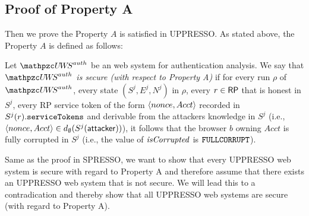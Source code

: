   \subsection{Proof of Property A}
  Then we prove the Property $A$ is satisfied in UPPRESSO.
  As stated above, the Property $A$ is defined as follows:
  \begin{definition}\label{def:uppresso-security-property} 
    Let $\uppressoauthwebsystem$ be an \uppresso web system 
    for authentication analysis. We say that 
    \emph{$\uppressoauthwebsystem$ is secure 
    (with respect to Property A)} if for every run $\rho$ of 
    $\uppressoauthwebsystem$, every state $(S^j, E^j, N^j)$ in 
    $\rho$, every $r\in \mathsf{RP}$ that is honest in $S^j$, 
    every RP service token of the form $\langle {{}nonce, Acct} \rangle$ 
    recorded in $S^j(r).\mathtt{serviceTokens}$ and derivable 
    from the attackers knowledge in $S^j$ (i.e., 
    $\langle {{}nonce, Acct} \rangle \in 
    d_{\emptyset}(S^j(\mathsf{attacker}))$), it follows that the 
    browser $b$ owning $Acct$ is fully corrupted in $S^j$ 
    (i.e., the value of $\mathit{isCorrupted}$ is $\mathtt{FULLCORRUPT}$). 
  \end{definition}
  
  
  Same as the proof in SPRESSO, we want to show that every UPPRESSO web system is secure with regard to Property A and therefore assume that there exists an UPPRESSO web system that is not secure. We will lead this to a contradication and thereby show that all UPPRESSO web systems are secure (with regard to Property A).
  
